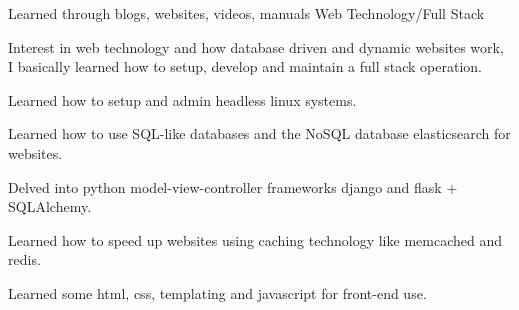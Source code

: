 \begin{cventries}
\cventry
  {Learned through blogs, websites, videos, manuals} %
  {Web Technology/Full Stack} %
  {} %
  {} %
  {
    \begin{cvitems} %
      \item {Interest in web technology and how database driven and dynamic websites work, I basically learned how to setup, develop and maintain a full stack operation.}
      \item {Learned how to setup and admin headless linux systems.}
      \item {Learned how to use SQL-like databases and the NoSQL database elasticsearch for websites.}
      \item {Delved into python model-view-controller frameworks django and flask + SQLAlchemy.}
      \item {Learned how to speed up websites using caching technology like memcached and redis.}
      \item {Learned some html, css, templating and javascript for front-end use.}
    \end{cvitems}
  }


\end{cventries}
